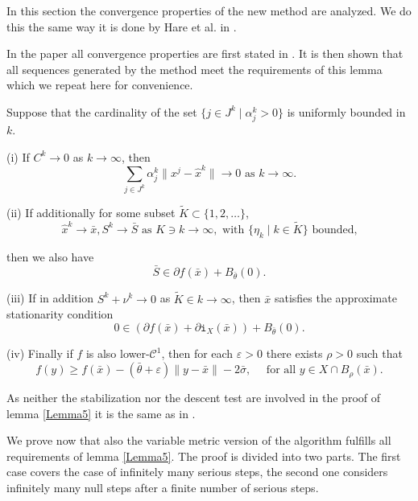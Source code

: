 In this section the convergence properties of the new method are analyzed. We do this the same way it is done by Hare et al. in \cite{Hare2016}.

In the paper all convergence properties are first stated in \cite[Lemma 5]{Hare2016}. It is then shown that all sequences generated by the method meet the requirements of this lemma which we repeat here for convenience.

\begin{lemma}\label{Lemma5}
	Suppose that the cardinality of the set \(\{j \in J^k\mid \alpha_j^k > 0\}\) is uniformly bounded in \(k\).
	
	(i) If \(C^k \to 0\) as \(k \to \infty\), then 
	\[ \sum_{j \in J^k}\alpha_j^k\|x^j-\hat{x}^k\| \to 0 \text{ as } k \to \infty. \]
	
	(ii) If additionally for some subset \(\tilde{K} \subset \{1,2,\dots\}\),
	\[\hat{x}^k \to \bar{x}, S^k \to \bar{S} \text{ as } K \ni k \to \infty, \text{ with } \{\eta_k\mid k \in \tilde{K}\} \text{ bounded,} \]
	
	then we also have 
	\[\bar{S} \in \partial f(\bar{x})+B_{\bar{\theta}}(0).\]
	
	(iii) If in addition \(S^k + \nu^k \to 0\) as \(\tilde{K} \in k \to \infty\), then \(\bar{x}\) satisfies the approximate stationarity condition 
	\begin{equation}
		0 \in \left(\partial f(\bar{x}) + \partial \mathtt{i}_X(\bar{x}) \right) + B_{\bar{\theta}}(0).
	\end{equation}
	
	(iv) Finally if \(f\) is also lower-\(\mathcal{C}^1\), then for each \(\varepsilon > 0\) there exists \(\rho > 0\) such that
	\begin{equation}
		f(y) \geq f(\bar{x})-(\bar{\theta}+\varepsilon)\|y-\bar{x}\|-2\bar{\sigma}, \quad \text{ for all } y \in X\cap B_{\rho}(\bar{x}).
	\end{equation}
\end{lemma}

As neither the stabilization nor the descent test are involved in the proof of lemma \ref{Lemma5} it is the same as in \cite{Hare2016}.

We prove now that also the variable metric version of the algorithm fulfills all requirements of lemma \ref{Lemma5}.
The proof is divided into two parts. The first case covers the case of infinitely many serious steps, the second one considers infinitely many null steps after a finite number of serious steps.

